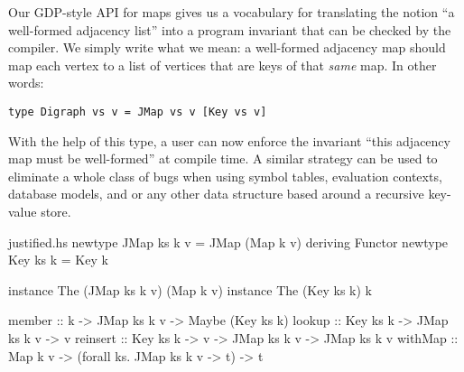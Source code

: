 \documentclass[format=sigplan, review=false, screen=true, 10pt]{acmart}
\begin{document}
Our GDP-style API for maps gives us a vocabulary for
translating the notion ``a well-formed adjacency list'' into a program invariant that can
be checked by the compiler. We simply write what we mean: a well-formed adjacency
map should map each vertex to a list of vertices that are keys of that \emph{same} map.
In other words:
\begin{verbatim}
type Digraph vs v = JMap vs v [Key vs v]
\end{verbatim}
With the help of this type, a user can now enforce the invariant ``this adjacency map
must be well-formed'' at compile time. A similar strategy can be used to eliminate a
whole class of bugs when using symbol tables, evaluation contexts,
database models, and or any other data structure based around a recursive key-value store.

\begin{filecontents*}{justified.hs}
newtype JMap ks k v = JMap (Map k v) deriving Functor
newtype Key  ks k   = Key k

instance The (JMap ks k v) (Map k v)
instance The (Key ks k) k

member   :: k -> JMap ks k v -> Maybe (Key ks k)
lookup   :: Key ks k -> JMap ks k v -> v
reinsert :: Key ks k -> v -> JMap ks k v -> JMap ks k v
withMap  :: Map k v -> (forall ks. JMap ks k v -> t) -> t
\end{filecontents*}

\end{document}
